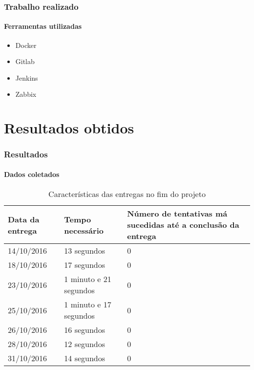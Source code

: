 \documentclass[aspectratio=169]{beamer}
\begin{document}
\begin{frame}
	\frametitle{Trabalho realizado}
	\framesubtitle{Ferramentas utilizadas}
	
	\begin{itemize}
		
		\item Docker 
		
		\item Gitlab
		
		\item Jenkins
		
		\item Zabbix
		
	\end{itemize}
	
\end{frame}

\section{Resultados obtidos}

\begin{frame}
	\frametitle{Resultados}
	\framesubtitle{Dados coletados}
	
	\begin{table}[htb]
		\caption{Características das entregas no fim do projeto}
		
		\label{tab-deploys-new}	
		\begin{tabular}{p{3.0cm}|p{5.0cm}|p{5.20cm}}
			\textbf{Data da entrega} & \textbf{Tempo necessário} & \textbf{Número de tentativas má sucedidas até a conclusão da entrega}  \\
			\hline
			14/10/2016 & 13 segundos & 0 \\
			\hline
			18/10/2016 & 17 segundos & 0 \\
			\hline
			23/10/2016 & 1 minuto e 21 segundos & 0 \\
			\hline
			25/10/2016 & 1 minuto e 17 segundos & 0 \\
			\hline
			26/10/2016 & 16 segundos & 0 \\
			\hline
			28/10/2016 & 12 segundos & 0 \\
			\hline
			31/10/2016 & 14 segundos & 0 \\
		\end{tabular}
	\end{table}
	
\end{frame}
\end{document}
